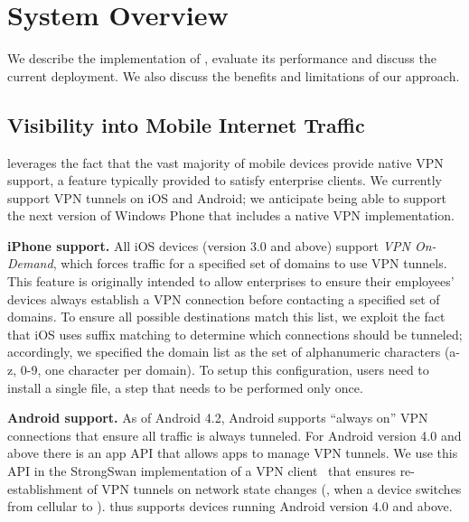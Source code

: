 %

\section{System Overview}
We describe the implementation of \meddle, evaluate its performance and discuss 
the current deployment. We also discuss the benefits and limitations of our approach.

\subsection{Visibility into Mobile Internet Traffic}
\label{subsec:design_visibility}

\meddle leverages the fact that the vast majority of mobile devices provide native VPN support, a feature typically provided to satisfy enterprise clients. We currently support VPN tunnels on iOS and Android; we anticipate being able to support the next version of Windows Phone that includes a native VPN implementation.

\noindent\textbf{iPhone support.} 
All iOS devices (version 3.0 and above) support \textit{VPN On-Demand}, which forces traffic for a specified set of domains to use VPN tunnels. 
This feature is originally intended to allow enterprises to ensure their employees' devices always establish a VPN connection before contacting a specified set of domains. 
To ensure all possible destinations match this list, we exploit the fact that iOS uses suffix matching to determine which connections should be tunneled; accordingly, we specified the domain list as the set of alphanumeric characters (a-z, 0-9, one character per domain). 
To setup this configuration, users need to install a single file, a step that needs to be performed only once. 

\noindent\textbf{Android support.} As of Android 4.2, Android supports ``always on'' VPN connections that ensure all traffic is always tunneled.
For Android version 4.0 and above there is an app API that allows apps to manage VPN tunnels. 
We use this API in the StrongSwan implementation of a VPN client~\cite{strongswanclient} that ensures re-establishment of VPN tunnels on network state changes (\eg, when a device switches from cellular to \wifi).
\meddle thus supports devices running Android version 4.0 and above.

